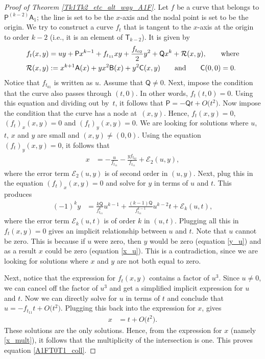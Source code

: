 \documentclass[pdftex]{sigma}
\numberwithin{equation}{section}
\begin{document}
\begin{proof}[Proof of Theorem \ref{Tk1Tk2_etc_alt_way_A1F}]
Let $f$ be a curve that belongs to $\mathsf{P}^{(k-2)}\mathsf{A}_1$; the line is set to be the $x$-axis and the nodal point
is set to be the origin. We try to construct a curve
$f_t$ that is tangent to the
$x$-axis at the origin to order $k-2$ (i.e., it is an element of $\mathsf{T}_{k-2}$). It is given by
\begin{align*}
f_t(x, y)& = u y + \mathsf{P} x^{k-1} + f_{t_{11}} x y + \frac{f_{t_{02}}}{2} y^2 +
\mathsf{Q} x^k + \mathcal{R} (x, y), \qquad
\textnormal{where} \\
\mathcal{R} (x, y)& := x^{k+1}\mathsf{A} (x) + y x^2 \mathsf{B} (x) + y^2 \mathsf{C} (x,y) \qquad \textnormal{and}
\qquad \mathsf{C} (0, 0) = 0.
\end{align*}
Notice that $f_{t_{01}}$ is written as $u$. Assume that $\mathsf{Q} \neq 0$.
Next, impose the condition that the curve also passes through $(t, 0)$.
In other words, $f_t(t, 0) = 0$. Using this equation and dividing out by~$t$, it follows that
$
\mathsf{P}  =  - \mathsf{Q} t + O\bigl(t^2\bigr)$.
Now impose the condition that the curve has a node at~$(x, y)$. Hence,
$
f_{t}(x, y)  = 0$, $ (f_{t})_x(x, y) = 0 $ and $(f_{t})_y(x, y) = 0$.
We are looking for solutions where $u$, $t$, $x$ and $y$ are small and $(x, y) \neq (0, 0)$.
Using the equation~${(f_{t})_y(x, y) = 0}$, it follows that
\begin{align}
x &  =  -\frac{u}{f_{t_{11}}} -\frac{y f_{t_{02}}}{f_{t_{11}}} + \mathcal{E}_2 (u, y),
\label{x_u}
\end{align}
where the error term $\mathcal{E}_2 (u, y)$ is of second order in $(u, y)$.
Next, plug this in the equation $(f_{t})_x(x, y) = 0$ and solve for $y$ in terms of $u$ and $t$. This produces
\begin{align}
(-1)^ky &  =  \frac{k \mathsf{Q}}{f_{t_{11}}^k} u^{k-1} + \frac{(k-1)\mathsf{Q}}{f_{t_{11}}^{k-1}} u^{k-2} t + \mathcal{E}_{k} (u, t), \label{y_u}
\end{align}
where the error term $\mathcal{E}_k(u, t)$ is of order $k$ in $(u, t)$.
Plugging all this in $f_{t}(x, y) = 0$ gives an implicit relationship between $u$ and $t$.
Note that $u$ cannot be zero.
This is because if $u$ were zero, then $y$ would be zero (equation \eqref{y_u})
and as a result $x$ could be zero (equation \eqref{x_u}). This is a contradiction,
since we are looking for solutions
where $x$ and $y$ are not both equal to zero.

Next, notice that the expression for $f_{t}(x, y)$ contains a factor of $u^3$.
Since $u \neq 0$, we can cancel off the factor of $u^3$ and get a
simplified implicit expression for $u$ and $t$. Now we can directly solve for $u$ in terms of $t$ and conclude that
$
u  =  -f_{t_{11}} t + O\bigl(t^2\bigr)$.
Plugging this back into the expression for $x$, gives
\begin{align}
x &  =  t + O\bigl(t^2\bigr). \label{x_mult}
\end{align}
These solutions are the only solutions.
Hence, from the expression for $x$ (namely \eqref{x_mult}), it follows that the multiplicity of the intersection is one.
This proves equation \eqref{A1FT0T1_coll}.


\end{proof}
\end{document}
